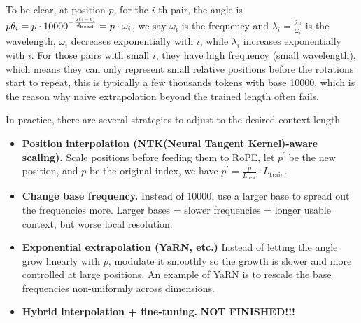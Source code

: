 \documentclass[11pt]{article}  %
\begin{document}
To be clear, at position $p$, for the $i$-th pair, the angle is $p\theta_i = p \cdot 10000^{-\frac{2(i - 1)}{d_{\text{head}}}} = p \cdot \omega_i$, we say $\omega_i$ is the frequency and $\lambda_i = \frac{2\pi}{\omega_i}$ is the wavelength, $\omega_i$ decreases exponentially with $i$, while $\lambda_i$ increases exponentially with $i$.
For those pairs with small $i$, they have high frequency (small wavelength), which means they can only represent small relative positions before the rotations start to repeat, this is typically a few thousands tokens with base 10000, which is the reason why naive extrapolation beyond the trained length often fails.

In practice, there are several strategies to adjust to the desired context length
\begin{itemize}
  \item \textbf{Position interpolation (NTK(Neural Tangent Kernel)-aware scaling).} Scale positions before feeding them to RoPE, let $p^\prime$ be the new position, and $p$ be the original index, we have $p^\prime = \frac{p}{L_{\text{new}}} \cdot L_{\text{train}}$.
  
  \item \textbf{Change base frequency.} Instead of 10000, use a larger base to spread out the frequencies more. Larger bases = slower frequencies = longer usable context, but worse local resolution.
  
  \item \textbf{Exponential extrapolation (YaRN, etc.)} Instead of letting the angle grow linearly with $p$, modulate it smoothly so the growth is slower and more controlled at large positions. An example of YaRN is to rescale the base frequencies non-uniformly across dimensions.
  
  \item \textbf{Hybrid interpolation + fine-tuning.} \textbf{NOT FINISHED!!!}
\end{itemize}
\end{document}
